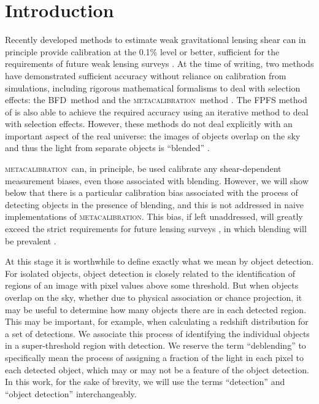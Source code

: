 \documentclass[iop, twocolappendix, appendixfloats, numberedappendix, apj]{hackemulateapj}
\newcommand{\mcal}{\textsc{metacalibration}}
\newcommand{\bfd}{\textsc{BFD}}
\begin{document}
\section{Introduction} \label{sec:intro}

Recently developed methods to estimate weak gravitational lensing shear can in
principle provide calibration at the 0.1\% level or better, sufficient for the
requirements of future weak lensing surveys \citep[e.g.,][]{huterer2006}.  At
the time of writing, two methods have demonstrated sufficient accuracy without
reliance on calibration from simulations, including rigorous mathematical
formalisms to deal with selection effects:  the \bfd\ method
\citep{BernBFD2016} and the \mcal\ method \citep{HuffMcal2017,SheldonMcal2017}.
The FPFS method of \cite{FPFS2018} is also able to achieve the required
accuracy using an iterative method to deal with selection effects.  However,
these methods do not deal explicitly with an important aspect of the real
universe: the images of objects overlap on the sky and thus the light from
separate objects is ``blended'' \citep[for discussion of blending
effects see, e.g.,][]{DawsonBlending2016}.

\mcal\ can, in principle, be used calibrate any shear-dependent measurement
biases, even those associated with blending.  However, we will show below that
there is a particular calibration bias associated with the process of detecting
objects in the presence of blending, and this is not addressed in naive
implementations of \mcal. This bias, if left unaddressed, will greatly exceed
the strict requirements for future lensing surveys \citep{huterer2006}, in
which blending will be prevalent \citep{DawsonBlending2016}.

At this stage it is worthwhile to define exactly what we mean by object
detection.  For isolated objects, object detection is closely related to the
identification of regions of an image with pixel values above some threshold.
But when objects overlap on the sky, whether due to physical association or
chance projection, it may be useful to determine how many objects there are in
each detected region. This may be important, for example, when calculating a
redshift distribution for a set of detections.  We associate this process of
identifying the individual objects in a super-threshold region with detection.
We reserve the term ``deblending'' to specifically mean the process of
assigning a fraction of the light in each pixel to each detected object, which
may or may not be a feature of the object detection.  In this work, for the
sake of brevity, we will use the terms ``detection'' and ``object detection''
interchangeably.
\end{document}
